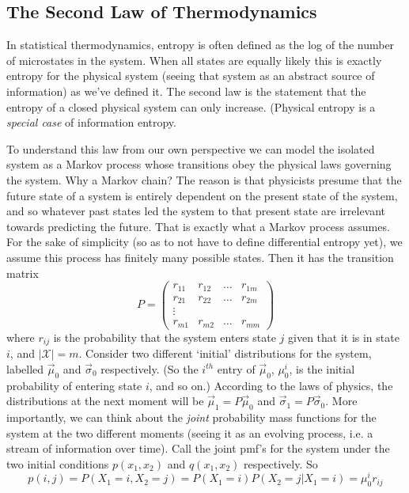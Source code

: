 \subsection{The Second Law of Thermodynamics}
	In statistical thermodynamics, entropy is often defined as the log of the number of microstates in the system. When all states are equally likely this is exactly entropy for the physical system (seeing that system as an abstract source of information) as we've defined it. The second law is the statement that the entropy of a closed physical system can only increase. (Physical entropy is a \emph{special case} of information entropy.  \par 
	To understand this law from our own perspective we can model the isolated system as a Markov process whose transitions obey the physical laws governing the system. Why a Markov chain? The reason is that physicists presume that the future state of a system is entirely dependent on the present state of the system, and so whatever past states led the system to that present state are irrelevant towards predicting the future. That is exactly what a Markov process assumes. For the sake of simplicity (so as to not have to define differential entropy yet), we assume this process has finitely many possible states. Then it has the transition matrix
	\[ P = \begin{pmatrix} r_{11} & r_{12} & \ldots & r_{1m} \\
							r_{21} & r_{22} & \ldots & r_{2m} \\
							\vdots \\ r_{m1} & r_{m2} & \ldots & r_{mm} \end{pmatrix} \]
where $r_{ij}$ is the probability that the system enters state $j$ given that it is in state $i$, and $|\mathcal{X}| = m$. Consider two different `initial' distributions for the system, labelled $\vec{\mu}_0$ and $\vec{\sigma}_0$ respectively. (So the $i^{th}$ entry of $\vec{\mu}_0$, $\mu_0^i$, is the initial probability of entering state $i$, and so on.) According to the laws of physics, the distributions at the next moment will be $\vec{\mu}_1 = P\vec{\mu}_0$ and $\vec{\sigma}_1 = P\vec{\sigma}_0$. More importantly, we can think about the \emph{joint} probability mass functions for the system at the two different moments (seeing it as an evolving process, i.e. a stream of information over time). Call the joint pmf's for the system under the two initial conditions $p(x_1,x_2)$ and $q(x_1,x_2)$ respectively. So 
\[ p(i,j) = P(X_1 = i, X_2 = j) = P(X_1 = i)P(X_2 = j|X_1 = i) = \mu_0^ir_{ij} \]
